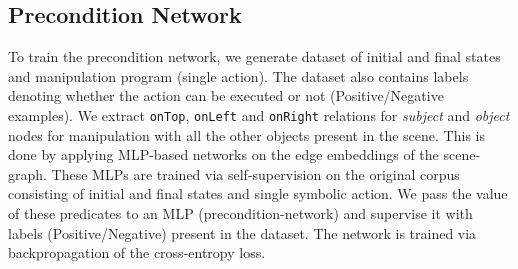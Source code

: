 \subsection{Precondition Network}
To train the precondition network, we generate dataset of initial and final states and manipulation program (single action). The dataset also contains labels denoting whether the action can be executed or not (Positive/Negative examples). We extract \texttt{onTop}, \texttt{onLeft} and \texttt{onRight} relations for \textit{subject} and \textit{object} nodes for manipulation with all the other objects present in the scene. This is done by applying MLP-based networks on the edge embeddings of the scene-graph. These MLPs are trained via self-supervision on the original corpus consisting of initial and final states and single symbolic action. We pass the value of these predicates to an MLP (precondition-network) and supervise it with labels (Positive/Negative) present in the dataset. The network is trained via backpropagation of the cross-entropy loss.
	